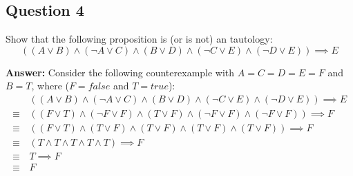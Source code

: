 \documentclass{article}
\begin{document}


\subsection*{Question 4}
Show that the following proposition is (or is not) an tautology:
$$((A\vee B)\wedge(\neg A\vee C)\wedge(B\vee D)\wedge(\neg C\vee E)\wedge(\neg D\vee E))\implies E$$

\noindent\textbf{Answer:} Consider the following counterexample with $A=C=D=E=F$ and $B=T$, where ($F=false$ and $T=true$):
\begin{align*}
&\,((A\vee B)\wedge(\neg A\vee C)\wedge(B\vee D)\wedge(\neg C\vee E)\wedge(\neg D\vee E))\implies E\\
\equiv &\,((F\vee T)\wedge(\neg F\vee F)\wedge(T\vee F)\wedge(\neg F\vee F)\wedge(\neg F\vee F))\implies F\tag{plug in truth values}\\
\equiv &\,((F\vee T)\wedge(T\vee F)\wedge(T\vee F)\wedge(T\vee F)\wedge(T\vee F))\implies F\\
\equiv &\,(T\wedge T\wedge T\wedge T\wedge T)\implies F\\
\equiv &\,T\implies F\\
\equiv &\,F
\end{align*}
\end{document}
